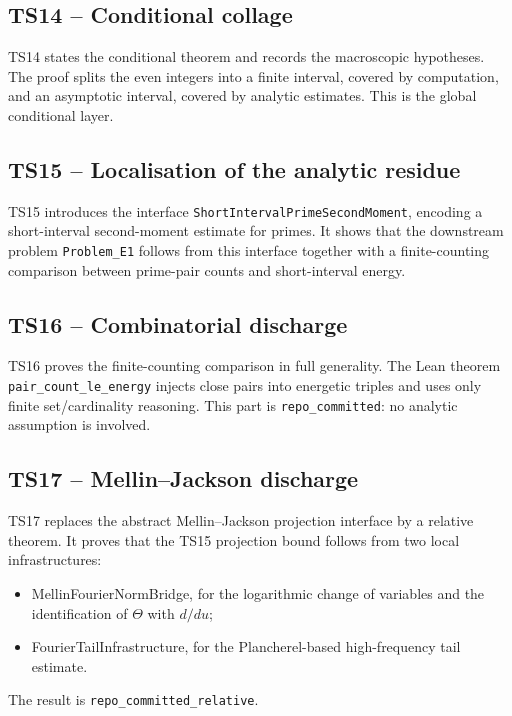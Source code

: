 \documentclass[11pt]{article}
\newcommand{\code}[1]{\texttt{#1}}
\newcommand{\status}[1]{\texttt{#1}}
\newcommand{\oblig}[1]{\textsf{#1}}
\begin{document}
\subsection{TS14 -- Conditional collage}

TS14 states the conditional theorem and records the macroscopic hypotheses. The
proof splits the even integers into a finite interval, covered by computation,
and an asymptotic interval, covered by analytic estimates. This is the global
conditional layer.

\subsection{TS15 -- Localisation of the analytic residue}

TS15 introduces the interface \code{ShortIntervalPrimeSecondMoment}, encoding a
short-interval second-moment estimate for primes. It shows that the downstream
problem \code{Problem_E1} follows from this interface together with a
finite-counting comparison between prime-pair counts and short-interval
energy.

\subsection{TS16 -- Combinatorial discharge}

TS16 proves the finite-counting comparison in full generality. The Lean theorem
\code{pair_count_le_energy} injects close pairs into energetic triples and
uses only finite set/cardinality reasoning. This part is
\status{repo_committed}: no analytic assumption is involved.

\subsection{TS17 -- Mellin--Jackson discharge}

TS17 replaces the abstract Mellin--Jackson projection interface by a relative
theorem. It proves that the TS15 projection bound follows from two local
infrastructures:
\begin{itemize}
  \item \oblig{MellinFourierNormBridge}, for the logarithmic change of
    variables and the identification of \(\Theta\) with \(d/du\);
  \item \oblig{FourierTailInfrastructure}, for the Plancherel-based
    high-frequency tail estimate.
\end{itemize}
The result is \status{repo_committed_relative}.
\end{document}
